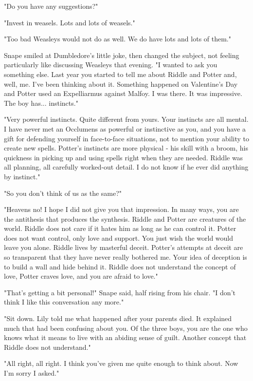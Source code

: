 \documentclass[a4paper,11pt]{article}
\begin{document}
"Do you have any suggestions?"

"Invest in weasels. Lots and lots of weasels."

"Too bad Weasleys would not do as well. We do have lots and lots of them."

Snape smiled at Dumbledore's little joke, then changed the subject, not feeling particularly like discussing Weasleys that evening. "I wanted to ask you something else. Last year you started to tell me about Riddle and Potter and, well, me. I've been thinking about it. Something happened on Valentine's Day and Potter used an Expelliarmus against Malfoy. I was there. It was impressive. The boy has... instincts."

"Very powerful instincts. Quite different from yours. Your instincts are all mental. I have never met an Occlumens as powerful or instinctive as you, and you have a gift for defending yourself in face-to-face situations, not to mention your ability to create new spells. Potter's instincts are more physical - his skill with a broom, his quickness in picking up and using spells right when they are needed. Riddle was all planning, all carefully worked-out detail. I do not know if he ever did anything by instinct."

"So you don't think of us as the same?"

"Heavens no! I hope I did not give you that impression. In many ways, you are the antithesis that produces the synthesis. Riddle and Potter are creatures of the world. Riddle does not care if it hates him as long as he can control it. Potter does not want control, only love and support. You just wish the world would leave you alone. Riddle lives by masterful deceit. Potter's attempts at deceit are so transparent that they have never really bothered me. Your idea of deception is to build a wall and hide behind it. Riddle does not understand the concept of love, Potter craves love, and you are afraid to love."

"That's getting a bit personal!" Snape said, half rising from his chair. "I don't think I like this conversation any more."

"Sit down. Lily told me what happened after your parents died. It explained much that had been confusing about you. Of the three boys, you are the one who knows what it means to live with an abiding sense of guilt. Another concept that Riddle does not understand."

"All right, all right. I think you've given me quite enough to think about. Now I'm sorry I asked."
\end{document}
